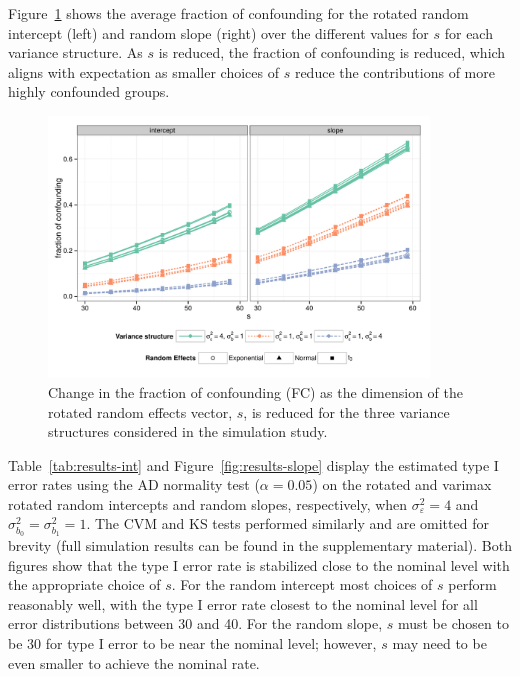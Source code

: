 \documentclass[12pt]{article} %
\begin{document}
Figure~\ref{fig:fc} shows the average fraction of confounding for the rotated random intercept (left) and random slope (right) over the different values for $s$ for each variance structure. As $s$ is reduced, the fraction of confounding is reduced, which aligns with expectation as smaller choices of $s$ reduce the contributions of more highly confounded groups.

\begin{figure}[h]
	\centering
	\includegraphics[width=0.9\textwidth]{fc_by_s.pdf}
	\caption{\label{fig:fc} Change in the fraction of confounding (FC) as the dimension of the rotated random effects vector, $s$, is reduced for the three variance structures considered in the simulation study. %
	}
\end{figure}

Table~\ref{tab:results-int} and Figure~\ref{fig:results-slope} display the estimated type I error rates using the AD normality test ($\alpha = 0.05$) on the rotated and varimax rotated random intercepts and random slopes, respectively, when $\sigma^2_\varepsilon = 4$ and $\sigma^2_{b_0} = \sigma^2_{b_1} = 1$. The CVM and KS tests performed similarly and are omitted for brevity (full simulation results can be found in the supplementary material). Both figures show that the type I error rate is stabilized close to the nominal level with the appropriate choice of $s$. For the random intercept most choices of $s$ perform reasonably well, with the type I error rate closest to the nominal level for all error distributions between 30 and 40. For the random slope, $s$ must be chosen to be 30 for type I error to be near the nominal level; however, $s$ may need to be even smaller to achieve the nominal rate. 
\end{document}
